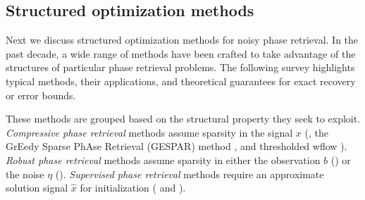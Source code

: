 \subsection{Structured optimization methods}  	\label{Subsubsec:phase_retrieval-structured}


Next we discuss structured optimization methods for noisy phase retrieval.  In the past decade, a wide range of methods have been crafted to take advantage of the structures of particular phase retrieval problems.  The following survey highlights typical methods, their applications, and theoretical guarantees for exact recovery or error bounds.  

These methods are grouped based on the structural property they seek to exploit.  \textit{Compressive phase retrieval} methods assume sparsity in the signal $x$ (\cite{DBLP:journals/corr/abs-1104-4406}, the GrEedy Sparse PhAse Retrieval (GESPAR) method \cite{shechtman2014gespar}, and thresholded wflow  \cite{cai2016optimal}).  \textit{Robust phase retrieval} methods assume sparsity in either the observation $b$ (\cite{katkovnik2017phase}) or the noise $\eta$  (\cite{jiang2017robust}).  \textit{Supervised phase retrieval} methods require an approximate solution signal $\hat{x}$ for initialization (\cite{goldstein2018phasemax} and \cite{bahmani2016phase}).  




